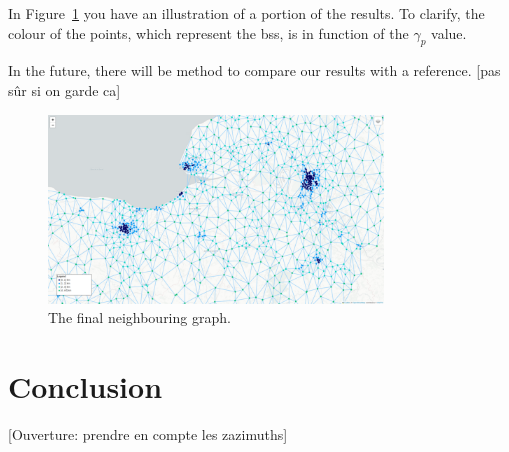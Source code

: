\documentclass[lettersize,journal,english]{IEEEtran}
\begin{document}
        In Figure~\ref{fig:final_neighs} you have an illustration of a portion of the results. To clarify, the colour of the points, which represent the \acrshort{bs}s, is in function of the $\gamma_p$ value.

        In the future, there will be method to compare our results with a reference. [pas sûr si on garde ca]
        \begin{figure}
            \centering
            \includegraphics[width=3.5in]{images/illus_graphs/final_neighs_del_da.png}
            \caption{The final neighbouring graph.}
            \label{fig:final_neighs}
        \end{figure}

\section{Conclusion\label{sec:ccl}}
    [Ouverture: prendre en compte les zazimuths]

\printglossary[type=\acronymtype]
\printglossary



\end{document}
